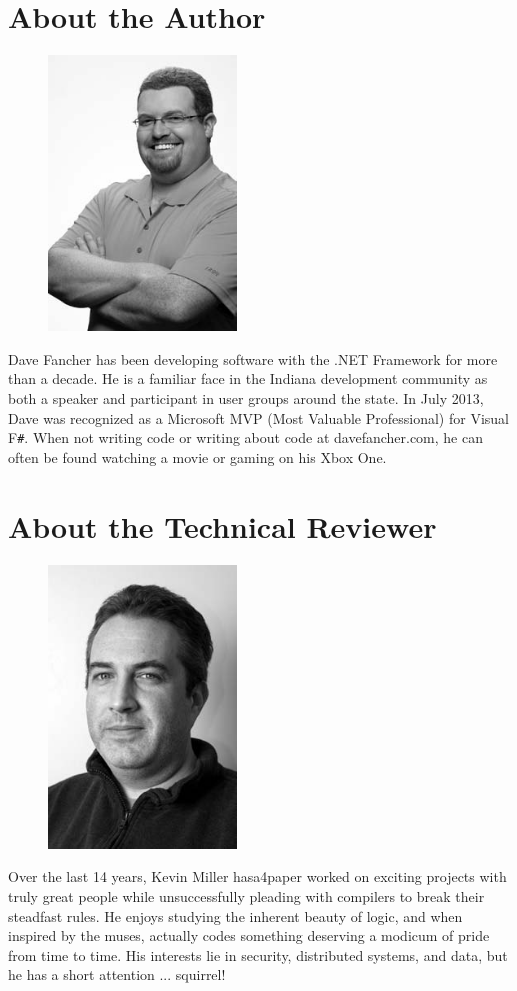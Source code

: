 \documentclass{book}
\begin{document}
\section{About the Author}
\begin{figure}
  \includegraphics[width=5.0cm]{../pic/Author.png}
\end{figure}
  Dave Fancher has been developing software with the .NET Framework for more than a decade. He is a familiar face in the Indiana development community as both a speaker and participant in user groups around the state. In July 2013, Dave was recognized as a Microsoft MVP (Most Valuable Professional) for Visual F\verb|#|. When not writing code or writing about code at davefancher.com, he can often be found watching a movie or gaming on his Xbox One.

\section{About the Technical Reviewer}
\begin{figure}
  \includegraphics[width=5.0cm]{../pic/KevinMiller.png}
\end{figure}
  Over the last 14 years, Kevin Miller hasa4paper worked on exciting projects with truly great people while unsuccessfully pleading with compilers to break their steadfast rules. He enjoys studying the inherent beauty of logic, and when inspired by the muses, actually codes something deserving a modicum of pride from time to time. His interests lie in security, distributed systems, and data, but he has a short attention ... squirrel!
\end{document}
